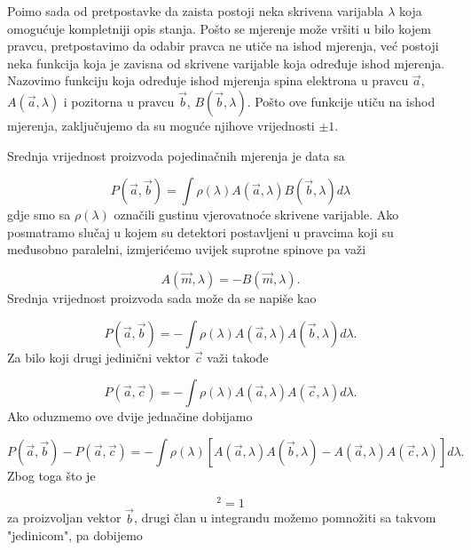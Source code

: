 Po\dj imo sada od pretpostavke da zaista postoji neka skrivena varijabla $\lambda$ koja omogućuje kompletniji opis stanja. Pošto se mjerenje može vršiti u bilo kojem pravcu, pretpostavimo da odabir pravca ne utiče na ishod mjerenja, već postoji neka funkcija koja je zavisna od skrivene varijable koja određuje ishod mjerenja.
Nazovimo funkciju koja određuje ishod mjerenja spina elektrona u pravcu $\vec{a}$, $A(\vec{a}, \lambda)$ i pozitorna u pravcu $\vec{b}$, $B(\vec{b}, \lambda)$.
Pošto ove funkcije utiču na ishod mjerenja, zaključujemo da su moguće njihove vrijednosti $\pm 1$.

Srednja vrijednost proizvoda pojedinačnih mjerenja je data sa

\begin{equation}
    P(\vec{a}, \vec{b}) = \int \rho (\lambda) A(\vec{a}, \lambda) B(\vec{b}, \lambda) d\lambda
\end{equation}
gdje smo sa $\rho (\lambda)$ označili gustinu vjerovatnoće skrivene varijable.
Ako posmatramo slučaj u kojem su detektori postavljeni u pravcima koji su međusobno paralelni, izmjerićemo uvijek suprotne spinove pa važi

\begin{equation}
    A(\vec{m}, \lambda) = - B(\vec{m}, \lambda).
\end{equation}
Srednja vrijednost proizvoda sada može da se napiše kao

\begin{equation}
    P(\vec{a}, \vec{b}) = - \int \rho (\lambda) A(\vec{a}, \lambda) A(\vec{b}, \lambda) d\lambda.
\end{equation}
Za bilo koji drugi jedinični vektor $\vec{c}$ važi takođe

\begin{equation}
    P(\vec{a}, \vec{c}) = - \int \rho (\lambda) A(\vec{a}, \lambda) A(\vec{c}, \lambda) d\lambda.
\end{equation}
Ako oduzmemo ove dvije jednačine dobijamo

\begin{equation}
    P(\vec{a}, \vec{b}) - P(\vec{a}, \vec{c})  = - \int \rho (\lambda) [A(\vec{a}, \lambda) A(\vec{b}, \lambda) - A(\vec{a}, \lambda) A(\vec{c}, \lambda) ] d\lambda.
\end{equation}
Zbog toga što je

\begin{equation}
    [A(\vec{b}, \lambda)]^2 = 1
\end{equation}
za proizvoljan vektor $\vec{b}$, drugi član u integrandu možemo pomnožiti sa takvom "jedinicom", pa dobijemo

